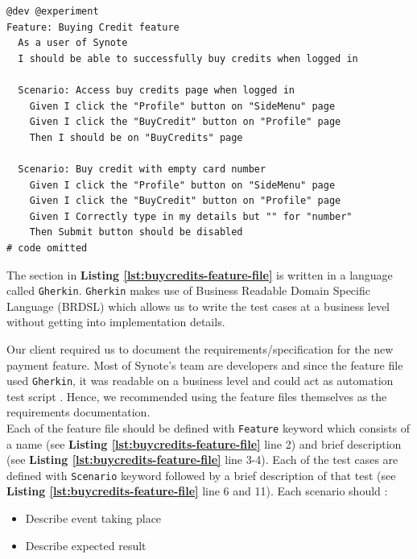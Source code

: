 \begin{listing}[H]
\begin{verbatim}
@dev @experiment
Feature: Buying Credit feature
  As a user of Synote
  I should be able to successfully buy credits when logged in

  Scenario: Access buy credits page when logged in
    Given I click the "Profile" button on "SideMenu" page
    Given I click the "BuyCredit" button on "Profile" page
    Then I should be on "BuyCredits" page

  Scenario: Buy credit with empty card number
    Given I click the "Profile" button on "SideMenu" page
    Given I click the "BuyCredit" button on "Profile" page
    Given I Correctly type in my details but "" for "number"
    Then Submit button should be disabled
# code omitted
\end{verbatim}
\label{lst:buycredits-feature-file}
\end{listing}

The section in \textbf{Listing \ref{lst:buycredits-feature-file}} is written in a language called \texttt{Gherkin}. \texttt{Gherkin} makes use of Business Readable Domain Specific Language (BRDSL) which allows us to write the test cases at a business level without getting into implementation details.

Our client required us to document the requirements/specification for the new payment feature. Most of Synote's team are developers and since the feature file used \texttt{Gherkin}, it was readable on a business level and could act as automation test script \cite{featurefile1}. Hence, we recommended using the feature files themselves as the requirements documentation.\\

Each of the feature file should be defined with \texttt{Feature} keyword which consists of a name  (see \textbf{Listing \ref{lst:buycredits-feature-file}} line  2) and brief description  (see \textbf{Listing \ref{lst:buycredits-feature-file}} line  3-4). Each of the test cases are defined with \texttt{Scenario} keyword followed by a brief description of that test (see \textbf{Listing \ref{lst:buycredits-feature-file}} line  6 and 11). Each scenario should \cite{featurefile3}:
\begin{itemize}
\item Describe event taking place
\item Describe expected result
\end{itemize}

